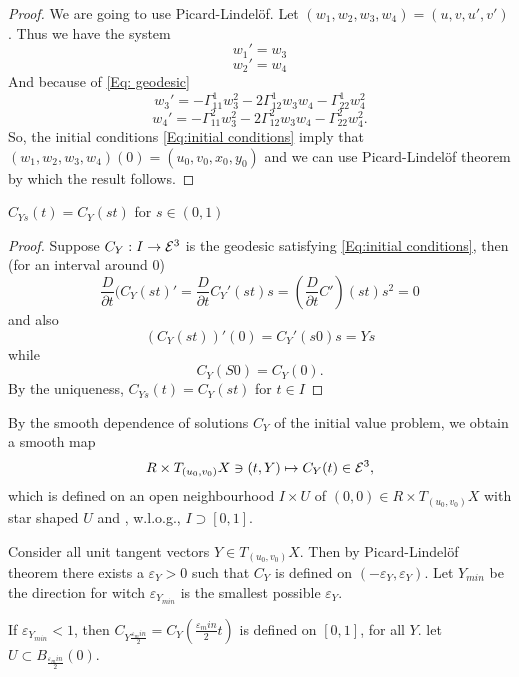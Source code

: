 \begin{proof}
	
	We are going to use Picard-Lindelöf.
	Let $ (w_1,w_2,w_3,w_4) = (u,v,u',v') $. Thus we have the system
		\[ w_1' = w_3 \]
		\[ w_2' = w_4 \]
		And because of \ref*{Eq: geodesic}
		\[ w_3' = -\Gamma_{11}^1w_3^2 - 2 \Gamma_{12}^1 w_3w_4 -\Gamma_{22}^1 w_4^2 \]
		\[ w_4' = -\Gamma_{11}^2w_3^2 - 2 \Gamma_{12}^2 w_3w_4 -\Gamma_{22}^2 w_4^2. \]
		So, the initial conditions \ref*{Eq:initial conditions} imply that $ (w_1,w_2,w_3,w_4)(0) = (u_0,v_0,x_0,y_0) $ and we can use Picard-Lindelöf theorem by which the result follows.
	
\end{proof}

\begin{lemma}
	
	$ C_{Ys}(t) = C_Y(st) $ for $ s \in (0,1) $
	
\end{lemma}

\begin{proof}
	
	Suppose $ C_Y: I \rightarrow \mathcal E^3 $ is the geodesic satisfying \ref*{Eq:initial conditions}, then (for an interval around $ 0 $)
		\[ \dfrac{D}{\partial t} (C_Y(st)' = \dfrac{D}{\partial t} C_Y'(st)s = (\dfrac{D}{\partial t} C') (st)s^2 = 0 \] 
	and also
		\[ (C_Y(st))'(0) = C_Y'(s0)s = Ys \]
	while
		\[ C_Y(S0) = C_Y(0). \]
	By the uniqueness, $ C_{Ys}(t) = C_Y(st) $ for $ t \in I $
\end{proof}

\begin{remark}
	By the smooth dependence of solutions $C_Y$ of the initial value problem, we obtain a smooth map 
		\[ R \times T_{(u_0,v_0)}X \ni (t,Y) \mapsto C_Y(t) \in \mathcal E^3, \]
	which is defined on an open neighbourhood $I \times U$ of $(0,0) \in R \times T_{(u_0,v_0)}X$ with star shaped $U$ and , w.l.o.g., $I \supset [0,1]$.
	
	Consider all unit tangent vectors $Y \in T_{(u_0,v_0)}X$. Then by Picard-Lindelöf theorem there exists a $\varepsilon_Y>0$ such that $C_Y$ is defined on $(-\varepsilon_Y, \varepsilon_Y)$.
	Let $Y_{min}$ be the direction for witch $\varepsilon_{Y_{min}}$ is the smallest possible $\varepsilon_Y$. 
	
	If $\varepsilon_{Y_{min}}<1$, then $C_{Y\frac {\varepsilon_min}2} = C_Y(\frac {\varepsilon_min}2 t)$ is defined on $[0,1]$, for all $Y$. let $ U \subset B_{\frac {\varepsilon_min}2}(0)$.
	\end{remark}

